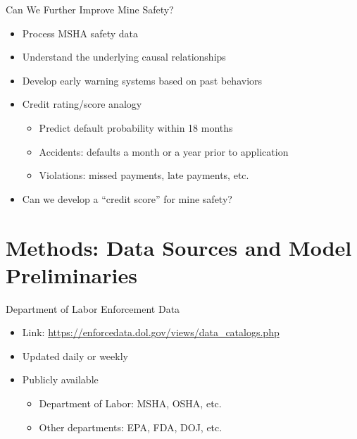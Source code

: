 \documentclass[
]{beamer}
\providecommand{\tightlist}{%
  \setlength{\itemsep}{0pt}\setlength{\parskip}{0pt}}
\begin{document}
\begin{frame}{Can We Further Improve Mine Safety?}

\begin{itemize}
\tightlist
\item
  Process MSHA safety data
\item
  Understand the underlying causal relationships
\item
  Develop early warning systems based on past behaviors
\item
  Credit rating/score analogy

  \begin{itemize}
  \tightlist
  \item
    Predict default probability within 18 months
  \item
    Accidents: defaults a month or a year prior to application
  \item
    Violations: missed payments, late payments, etc.
  \end{itemize}
\item
  Can we develop a ``credit score'' for mine safety?
\end{itemize}

\end{frame}

\section{Methods: Data Sources and Model
Preliminaries}\label{methods-data-sources-and-model-preliminaries}

\begin{frame}{Department of Labor Enforcement Data}

\begin{itemize}
\tightlist
\item
  Link: \url{https://enforcedata.dol.gov/views/data_catalogs.php}
\item
  Updated daily or weekly
\item
  Publicly available

  \begin{itemize}
  \tightlist
  \item
    Department of Labor: MSHA, OSHA, etc.
  \item
    Other departments: EPA, FDA, DOJ, etc.
  \end{itemize}
\end{itemize}

\end{frame}
\end{document}
